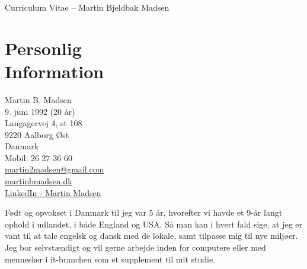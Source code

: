 \documentclass[margin,line,a4paper]{resume}
\begin{document}
\raggedright
{\sc \Large Curriculum Vitae -- Martin Bjeldbak Madsen}
\begin{resume}
    \vspace{0.5cm}
    \begin{figure}
         \vspace{-1cm}
        \begin{center}
        \end{center}
         \vspace{-2cm}
    \end{figure}

    \section{\mysidestyle Personlig\\Information}%
    Martin B. Madsen\\
    9. juni 1992 (20 år)\\ 
    Langagervej 4, st 108\\
    9220 Aalborg Øst\\
    Danmark\\
    Mobil: 26 27 36 60\\
    \href{mailto:martin2madsen@gmail.com}{martin2madsen@gmail.com}\\
    \href{http://www.martinbmadsen.dk}{martinbmadsen.dk}\\
    \href{http://dk.linkedin.com/pub/martin-madsen/21/9b0/b0}{LinkedIn - Martin Madsen}\vspace{1cm}

    Født og opvokset i Danmark til jeg var 5 år, hvorefter vi havde et
    9-år langt ophold i udlandet, i både England og USA. Så man kan i
    hvert fald sige, at jeg er vant til at tale engelsk og dansk med
    de lokale, samt tilpasse mig til nye miljøer. Jeg bor selvstændigt
    og vil gerne arbejde inden for computere eller med mennesker i
    it-branchen som et supplement til mit studie.


\end{resume}
\end{document}
